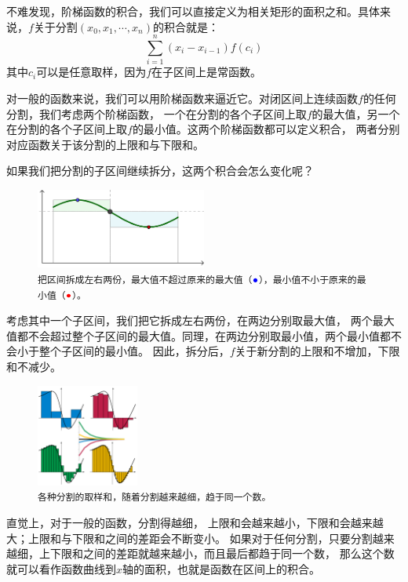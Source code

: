 \documentclass[12pt,UTF8]{ctexbook}
\theoremstyle{definition}
\theoremstyle{plain}
\begin{document}
\begin{appendix}
不难发现，阶梯函数的积合，我们可以直接定义为相关矩形的面积之和。具体来说，$f$关于分割$(x_0, x_1, \cdots, x_n)$的积合就是：
$$ \sum_{i=1}^n (x_i - x_{i-1}) f(c_i) $$
其中$c_i$可以是任意取样，因为$f$在子区间上是常函数。

对一般的函数来说，我们可以用阶梯函数来逼近它。对闭区间上连续函数$f$的任何分割，我们考虑两个阶梯函数，
一个在分割的各个子区间上取$f$的最大值，另一个在分割的各个子区间上取$f$的最小值。这两个阶梯函数都可以定义积合，
两者分别对应函数关于该分割的上限和与下限和。

如果我们把分割的子区间继续拆分，这两个积合会怎么变化呢？

\begin{figure} 
    \vspace{-32pt}
    \flushleft
    \includegraphics[width=0.5\textwidth]{tu/积分定义2.png}
    \caption*{\texttt{把区间拆成左右两份，最大值不超过原来的最大值（${\color{blue} \bullet}$），最小值不小于原来的最小值（${\color{red} \bullet}$）。}}
\end{figure}

考虑其中一个子区间，我们把它拆成左右两份，在两边分别取最大值，
两个最大值都不会超过整个子区间的最大值。同理，在两边分别取最小值，两个最小值都不会小于整个子区间的最小值。
因此，拆分后，$f$关于新分割的上限和不增加，下限和不减少。

\begin{figure} %
    \vspace{-35pt}
    \flushright
    \includegraphics[width=0.3\textwidth]{tu/积分定义6.png}
    \caption*{\texttt{各种分割的取样和，随着分割越来越细，趋于同一个数。}}
\end{figure}

直觉上，对于一般的函数，分割得越细，
上限和会越来越小，下限和会越来越大；上限和与下限和之间的差距会不断变小。
如果对于任何分割，只要分割越来越细，上下限和之间的差距就越来越小，而且最后都趋于同一个数，
那么这个数就可以看作函数曲线到$x$轴的面积，也就是函数在区间上的积合。


\end{appendix}
\end{document}

